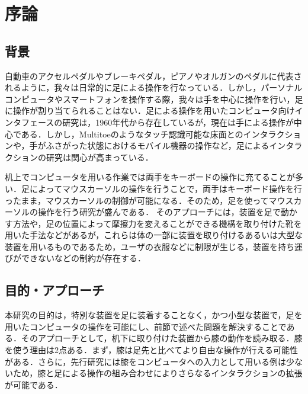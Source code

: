 \chapter{序論}

\section{背景}
自動車のアクセルペダルやブレーキペダル，ピアノやオルガンのペダルに代表されるように，我々は日常的に足による操作を行なっている．しかし，パーソナルコンピュータやスマートフォンを操作する際，我々は手を中心に操作を行い，足に操作が割り当てられることはない．足による操作を用いたコンピュータ向けインタフェースの研究は，1960年代から存在している\cite{1698228}が，現在は手による操作が中心である．しかし，Multitoe\cite{Augsten:2010:MHI:1866029.1866064}のようなタッチ認識可能な床面とのインタラクションや，手がふさがった状態におけるモバイル機器の操作\cite{Fan:2017:ESF:3123021.3123043, okumura_2011}など，足によるインタラクションの研究は関心が高まっている．\par
机上でコンピュータを用いる作業では両手をキーボードの操作に充てることが多い．足によってマウスカーソルの操作を行うことで，両手はキーボード操作を行ったまま，マウスカーソルの制御が可能になる．そのため，足を使ってマウスカーソルの操作を行う研究が盛んである．
%
そのアプローチには，装置を足で動かす方法\cite{Pearson:1986:MMD:22627.22392, Pearson:1988:EET:49108.1046356}や，足の位置によって摩擦力を変えることができる機構を取り付けた靴\cite{Horodniczy:2017:FHE:3025453.3025625}を用いた手法などがあるが，これらは体の一部に装置を取り付けるあるいは大型な装置を用いるものであるため，ユーザの衣服などに制限が生じる，装置を持ち運びができないなどの制約が存在する．



\section{目的・アプローチ}
本研究の目的は，特別な装置を足に装着することなく，かつ小型な装置で，足を用いたコンピュータの操作を可能にし、前節で述べた問題を解決することである．そのアプローチとして，机下に取り付けた装置から膝の動作を読み取る．膝を使う理由は2点ある．まず，膝は足先と比べてより自由な操作が行える可能性がある．さらに，先行研究には膝をコンピュータへの入力として用いる例は少ない\cite{1698228}ため，膝と足による操作の組み合わせによりさらなるインタラクションの拡張が可能である．

